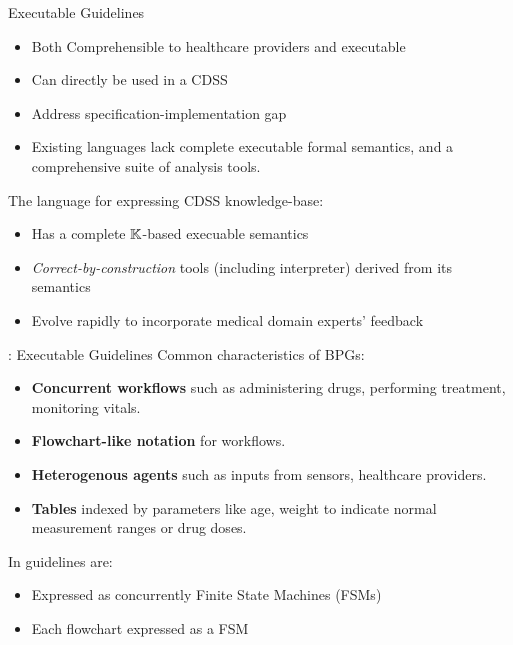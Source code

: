 \documentclass{beamer}
\begin{document}
\begin{frame}{Executable Guidelines}
  \begin{itemize}
    \item Both \alert{Comprehensible} to healthcare providers and \alert{executable}
    \item Can directly be used in a CDSS
    \item Address \alert{specification-implementation gap}
      \pause
    \item Existing languages lack complete executable formal semantics,
      and a comprehensive suite of analysis tools.
  \end{itemize}
  \pause
  The \MediK{} language for expressing CDSS knowledge-base:
  \begin{itemize}
    \item Has a complete $\mathbb{K}$-based execuable semantics
    \item \emph{Correct-by-construction} tools (including interpreter)
      derived from its semantics
    \item Evolve rapidly to incorporate medical domain experts' feedback

  \end{itemize}
\end{frame}

\begin{frame}{\MediK{}: Executable Guidelines}
  Common characteristics of BPGs:
  \begin{itemize}
    \item \textbf{Concurrent workflows} such as administering
      drugs, performing treatment, monitoring vitals.
    \item \textbf{Flowchart-like notation} for workflows.
    \item \textbf{Heterogenous agents} such as inputs from sensors, healthcare
      providers.
    \item \textbf{Tables} indexed by parameters like age, weight to indicate
      normal measurement ranges or drug doses.
  \end{itemize}
  \pause
  In \MediK{} guidelines are:
  \begin{itemize}
    \item Expressed as concurrently Finite State Machines (FSMs)
    \item Each flowchart expressed as a FSM
  \end{itemize}
\end{frame}
\end{document}
